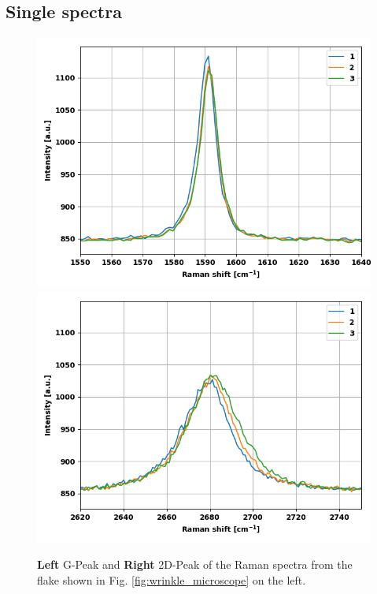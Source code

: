 \documentclass[12pt,a4paper]{article}
\begin{document}
\subsection{Single spectra}

\begin{figure}
\centering
\includegraphics[scale=0.5]{Bilder/Wrinkle/single_spectra/single_spectra_G_peak.PNG}
\includegraphics[scale=0.5]{Bilder/Wrinkle/single_spectra/single_spectra_2D_peak.PNG}
\caption{\textbf{Left} G-Peak and \textbf{Right} 2D-Peak of the Raman spectra from the flake shown in Fig. \ref{fig:wrinkle_microscope} on the left.}
\label{fig:wrinkle_Peaks}
\end{figure}
\end{document}
